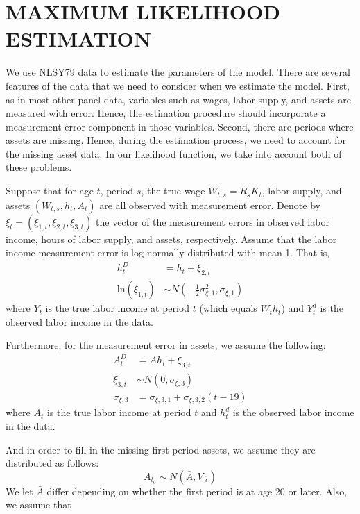 \documentclass[\econtexRoot/ImaiKeane]{subfiles}
\begin{document}
\section{MAXIMUM LIKELIHOOD ESTIMATION}
\label{section:MLE}
We use NLSY79 data to estimate the parameters of the model. There are several features of the data that we need to consider when we estimate the model. First, as in most other panel data, variables such as wages, labor supply, and assets are measured with error. Hence, the estimation procedure should incorporate a measurement error component in those variables. Second, there are periods where assets are missing. Hence, during the estimation process, we need to account for the missing asset data. In our likelihood function, we take into account both of these problems.\par
Suppose that for age $t$, period $s$, the true wage $W_{t,s} = R_s K_t$, labor supply, and assets $(W_{t,s}, h_t, A_t)$ are all observed with measurement error. Denote by $\xi_t = (\xi_{1,t}, \xi_{2,t}, \xi_{3,t})$ the vector of the measurement errors in observed labor income, hours of labor supply, and assets, respectively. Assume that the labor income measurement error is log normally distributed with mean 1. That is,
\begin{equation*}
  \begin{split}
    h_t^D &= h_t + \xi_{2,t}\\
    \text{ln}(\xi_{1,t}) & \sim N(-\frac{1}{2} \sigma_{\xi,1}^2,\sigma_{\xi,1})
    \end{split}
  \end{equation*}
  where $Y_t$ is the true labor income at period $t$ (which equals $W_th_t$) and $Y_t^d$ is the observed labor income in the data. \par
  Furthermore, for the measurement error in assets, we assume the following:
  \begin{equation*}
  \begin{split}
    A_t^D &= Ah_t + \xi_{3,t}\\
    \xi_{3,t} & \sim N(0,\sigma_{\xi,3})\\
    \sigma_{\xi,3}& = \sigma_{\xi,3,1}+\sigma_{\xi,3,2}(t-19)
    \end{split}
  \end{equation*}
  where $A_t$ is the true labor income at period $t$ and $h_t^d$ is the observed labor income in the data. \par
  And in order to fill in the missing first period assets, we assume they are distributed as follows:
  \begin{equation*}
    A_{t_0} \sim N(\bar{A},V_{\bar{A}})
    \end{equation*}
    We let $\bar{A}$ differ depending on whether the first period is at age 20 or later. Also, we assume that
    
\end{document}
